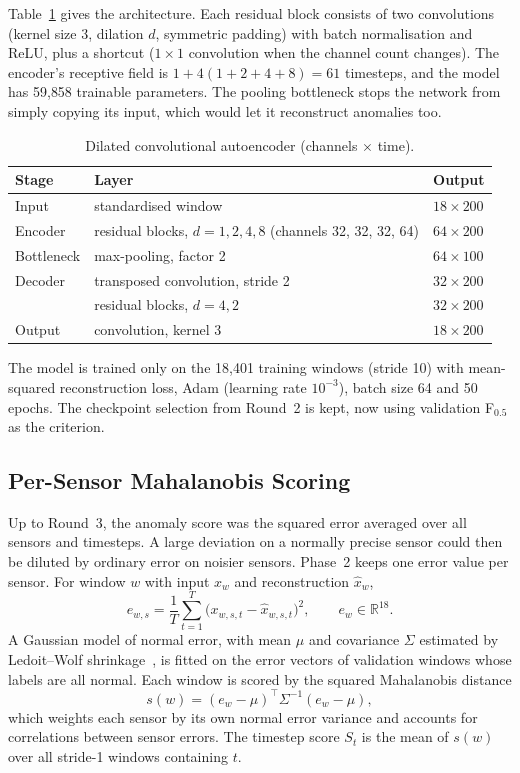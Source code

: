 \documentclass[runningheads]{llncs}
\begin{document}
Table~\ref{tab:arch} gives the architecture. Each residual block consists of two convolutions (kernel size 3, dilation $d$, symmetric padding) with batch normalisation and ReLU, plus a shortcut ($1\times1$ convolution when the channel count changes). The encoder's receptive field is $1 + 4(1+2+4+8) = 61$ timesteps, and the model has 59{,}858 trainable parameters. The pooling bottleneck stops the network from simply copying its input, which would let it reconstruct anomalies too.

\begin{table}[ht]
\centering
\caption{Dilated convolutional autoencoder (channels $\times$ time).}\label{tab:arch}
\begin{tabular}{|l|l|l|}
\hline
Stage & Layer & Output \\
\hline
Input & standardised window & $18 \times 200$ \\
Encoder & residual blocks, $d = 1, 2, 4, 8$ (channels 32, 32, 32, 64) & $64 \times 200$ \\
Bottleneck & max-pooling, factor 2 & $64 \times 100$ \\
Decoder & transposed convolution, stride 2 & $32 \times 200$ \\
 & residual blocks, $d = 4, 2$ & $32 \times 200$ \\
Output & convolution, kernel 3 & $18 \times 200$ \\
\hline
\end{tabular}
\end{table}

The model is trained only on the 18{,}401 training windows (stride 10) with mean-squared reconstruction loss, Adam (learning rate $10^{-3}$), batch size 64 and 50 epochs. The checkpoint selection from Round~2 is kept, now using validation F$_{0.5}$ as the criterion.

\subsection{Per-Sensor Mahalanobis Scoring}

Up to Round~3, the anomaly score was the squared error averaged over all sensors and timesteps. A large deviation on a normally precise sensor could then be diluted by ordinary error on noisier sensors. Phase~2 keeps one error value per sensor. For window $w$ with input $x_w$ and reconstruction $\hat{x}_w$,
\begin{equation}
  e_{w,s} = \frac{1}{T}\sum_{t=1}^{T}\bigl(x_{w,s,t} - \hat{x}_{w,s,t}\bigr)^2, \qquad e_w \in \mathbb{R}^{18}.
\end{equation}
A Gaussian model of normal error, with mean $\mu$ and covariance $\Sigma$ estimated by Ledoit--Wolf shrinkage~\cite{ledoit2004well}, is fitted on the error vectors of validation windows whose labels are all normal. Each window is scored by the squared Mahalanobis distance
\begin{equation}
  s(w) = (e_w - \mu)^\top \Sigma^{-1} (e_w - \mu),
\end{equation}
which weights each sensor by its own normal error variance and accounts for correlations between sensor errors. The timestep score $S_t$ is the mean of $s(w)$ over all stride-1 windows containing $t$.
\end{document}
